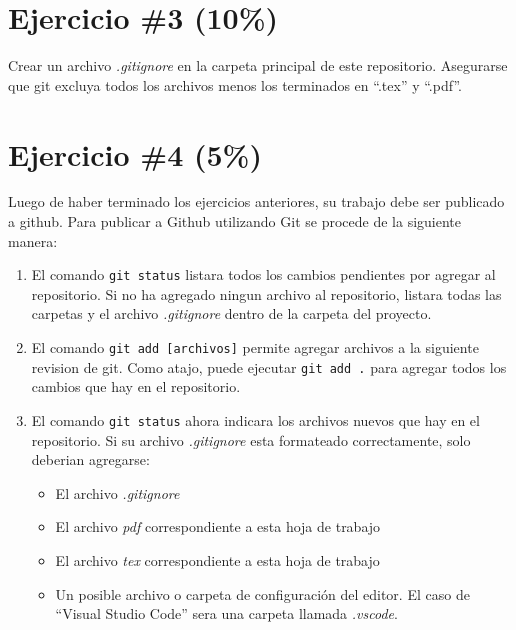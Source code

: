 \documentclass{article}
\begin{document}
    \section*{Ejercicio \#3 (10\%)}
    Crear un archivo \emph{.gitignore} en la carpeta principal de este repositorio.
    Asegurarse que git excluya todos los archivos menos los terminados en ``.tex'' y ``.pdf''.
    
    \section*{Ejercicio \#4 (5\%)}
    Luego de haber terminado los ejercicios anteriores, su trabajo debe
    ser publicado a github. Para publicar a Github utilizando Git se procede
    de la siguiente manera:
    \begin{enumerate}
            \item {
                    El comando \texttt{git status} listara todos los
                    cambios pendientes por agregar al repositorio. Si no
                    ha agregado ningun archivo al repositorio, listara todas
                    las carpetas y el archivo \emph{.gitignore} dentro de la
                    carpeta del proyecto.
            }
            \item{
                    El comando \texttt{git add [archivos]} permite agregar
                    archivos a la siguiente revision de git. Como atajo,
                    puede ejecutar \texttt{git add .} para agregar todos
                    los cambios que hay en el repositorio.
            }
            \item {
                    El comando \texttt{git status} ahora indicara los archivos
                    nuevos que hay en el repositorio. Si su archivo \emph{.gitignore}
                    esta formateado correctamente, solo deberian agregarse:
                    \begin{itemize}
                            \item{El archivo \emph{.gitignore}}
                            \item{El archivo \emph{pdf} correspondiente a esta hoja de trabajo}
                            \item{El archivo \emph{tex} correspondiente a esta hoja de trabajo}
                            \item{Un posible archivo o carpeta de configuraci\'on del editor.
                            El caso de ``Visual Studio Code'' sera una carpeta llamada \emph{.vscode}.}

\end{itemize}}
\end{enumerate}
\end{document}
